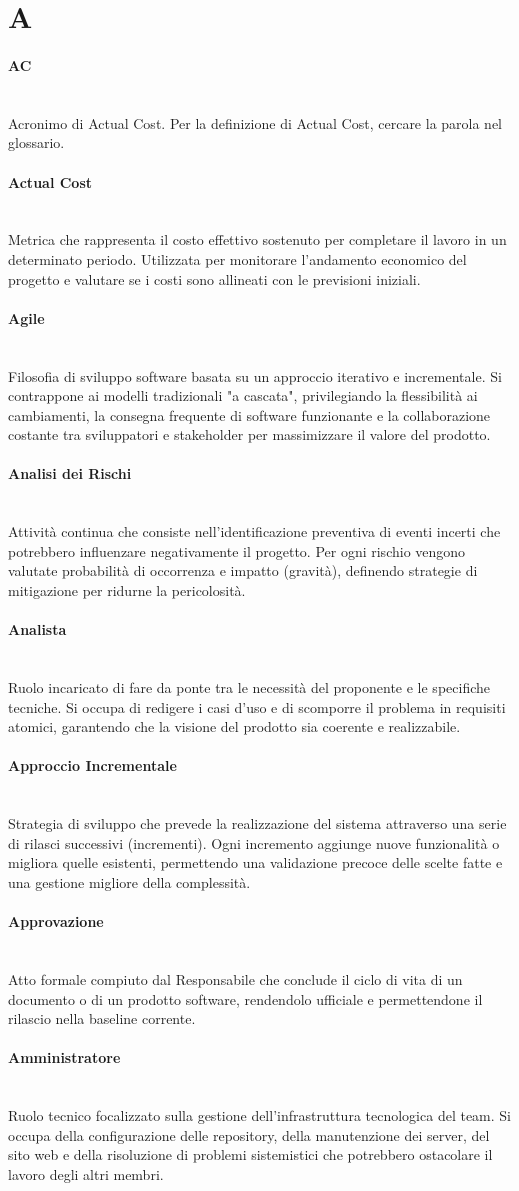 \documentclass[a4paper, 10pt, colorlinks=true, linkcolor=black, urlcolor=blue, citecolor=blue, hidelinks]{article}
\newcommand{\glossaryterm}[2]{
    \paragraph{#1 \label{term:#1}} \mbox{} \\
    #2
    \vspace{0.5em}
}
\begin{document}
\newpage

\section*{A}

\glossaryterm{AC}{Acronimo di Actual Cost. Per la definizione di Actual Cost, cercare la parola nel glossario.}

\glossaryterm{Actual Cost}{Metrica che rappresenta il costo effettivo sostenuto per completare il lavoro in un determinato periodo. Utilizzata per monitorare l'andamento economico del progetto e valutare se i costi sono allineati con le previsioni iniziali.}

\glossaryterm{Agile}{Filosofia di sviluppo software basata su un approccio iterativo e incrementale. Si contrappone ai modelli tradizionali "a cascata", privilegiando la flessibilità ai cambiamenti, la consegna frequente di software funzionante e la collaborazione costante tra sviluppatori e stakeholder per massimizzare il valore del prodotto.}

\glossaryterm{Analisi dei Rischi}{Attività continua che consiste nell'identificazione preventiva di eventi incerti che potrebbero influenzare negativamente il progetto. Per ogni rischio vengono valutate probabilità di occorrenza e impatto (gravità), definendo strategie di mitigazione per ridurne la pericolosità.}

\glossaryterm{Analista}{Ruolo incaricato di fare da ponte tra le necessità del proponente e le specifiche tecniche. Si occupa di redigere i casi d'uso e di scomporre il problema in requisiti atomici, garantendo che la visione del prodotto sia coerente e realizzabile.}

\glossaryterm{Approccio Incrementale}{Strategia di sviluppo che prevede la realizzazione del sistema attraverso una serie di rilasci successivi (incrementi). Ogni incremento aggiunge nuove funzionalità o migliora quelle esistenti, permettendo una validazione precoce delle scelte fatte e una gestione migliore della complessità.}

\glossaryterm{Approvazione}{Atto formale compiuto dal Responsabile che conclude il ciclo di vita di un documento o di un prodotto software, rendendolo ufficiale e permettendone il rilascio nella baseline corrente.}

\glossaryterm{Amministratore}{Ruolo tecnico focalizzato sulla gestione dell'infrastruttura tecnologica del team. Si occupa della configurazione delle repository, della manutenzione dei server, del sito web e della risoluzione di problemi sistemistici che potrebbero ostacolare il lavoro degli altri membri.}
\end{document}

